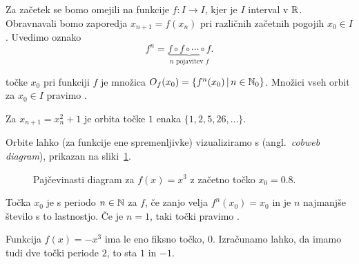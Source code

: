 

Za začetek se bomo omejili na funkcije $f: I \to I$, kjer je $I$ interval v
$\mathbb{R}$.
Obravnavali bomo zaporedja $x_{n+1} = f(x_n)$ pri različnih začetnih pogojih
$x_0 \in I$.
Uvedimo oznako
\[
  f^n = \underbrace{f \circ f \circ \cdots \circ f}_{\text{$n$ pojavitev $f$}}.
\]

\begin{definicija}
   točke $x_0$ pri funkciji $f$ je množica
  $O_f(x_0) = \{ f^n(x_0) \,|\, n \in \mathbb{N}_0 \}$.
  Množici vseh orbit za $x_0 \in I$ pravimo .
\end{definicija}

\begin{primer}
  Za $x_{n+1} = x_n^2 + 1$ je orbita točke $1$ enaka $\{ 1, 2, 5, 26, \ldots \}$.
\end{primer}

Orbite lahko (za funkcije ene spremenljivke) vizualiziramo s
 (angl.~\textit{cobweb diagram}), prikazan na
sliki~\ref{fig:ds-02-pajcevinasti-diagram}.

\begin{figure}[h!]
  \centering
  {
  \newcommand{\startv}{.8}
  }
  \caption[Pajčevinasti diagram]{Pajčevinasti diagram za $f(x) = x^3$ z začetno
	točko $x_0 = 0.8$.\footnotemark{}}%
  \label{fig:ds-02-pajcevinasti-diagram}
\end{figure}


\begin{definicija}
  Točka $x_0$ je  s periodo $n \in \mathbb{N}$ za $f$, če zanjo velja
  $f^n(x_0) = x_0$ in je $n$ najmanjše število s to lastnostjo.
  Če je $n = 1$, taki točki pravimo .
\end{definicija}

\begin{primer}
  Funkcija $f(x) = -x^3$ ima le eno fiksno točko, $0$.
  Izračunamo lahko, da imamo tudi dve točki periode $2$, to sta $1$ in $-1$.
\end{primer}

